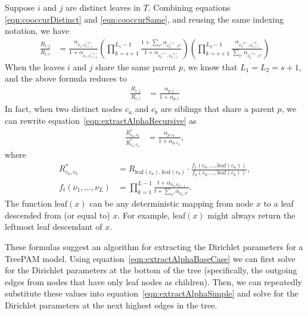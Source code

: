 \documentclass{article}
\theoremstyle{definition}
\newcommand{\leaf}{\text{leaf}}
\begin{document}
Suppose $i$ and $j$ are distinct leaves in $T$.
Combining equations \eqref{eqn:cooccurDistinct} and \eqref{eqn:cooccurSame}, and reusing the same indexing notation, we have
\begin{align}
\frac{R_{i,j}}{R_{i,i}}
&=
\frac
  { \alpha_{ \nu_s, \nu_{s+1}^{(2)} } }
  { 1 + \alpha_{ \nu_s, \nu_{s+1}^{(1)} } }
\left(
  \prod_{k=s+1}^{L_1-1}
    \frac
      { 1 + \sum_{\nu'} \alpha_{ \nu_k^{(1)}, \nu' } }
      { 1 + \alpha_{ \nu_k^{(1)}, \nu_{k+1}^{(1)} } }
\right)
\left(
  \prod_{k=s+1}^{L_2-1}
    \frac
      { \alpha_{ \nu_k^{(2)}, \nu_{k+1}^{(2)} } }
      { \sum_{\nu'} \alpha_{ \nu_k^{(2)}, \nu' } }
\right)
\label{eqn:extractAlphaRecursive}
\end{align}
When the leaves $i$ and $j$ share the same parent $p$, we know that $L_1 = L_2 = s+1$, and the above formula reduces to
\begin{align}
\frac{R_{i,j}}{R_{i,i}}
&=
\frac
  { \alpha_{ p, j } }
  { 1 + \alpha_{ p, i } }
\label{eqn:extractAlphaBaseCase}
\end{align}
In fact, when two distinct nodes $c_a$ and $c_b$ are siblings that share a parent $p$, we can rewrite equation~\eqref{eqn:extractAlphaRecursive} as
\begin{align}
\frac{R^*_{c_a,c_b}}{R^*_{c_a,c_a}}
&=
\frac
  { \alpha_{ p, c_b } }
  { 1 + \alpha_{ p, c_a } },
\label{eqn:extractAlphaSimple}
\end{align}
where
\begin{align*}
R^*_{c_a,c_b}
&= R_{\leaf(c_a),\leaf(c_b)} \cdot \frac{ f_1(c_a, \ldots, \leaf(c_a)) }{ f_0(c_b, \ldots, \leaf(c_b)) },
\\
f_t(\nu_{1}, \ldots, \nu_L)
&=
  \prod_{k=1}^{L-1}
    \frac
      { t + \alpha_{ \nu_k, \nu_{k+1} } }
      { t + \sum_{\nu'} \alpha_{ \nu_k, \nu' } }.
\end{align*}
The function $\leaf(x)$ can be any deterministic mapping from node $x$ to a leaf descended from (or equal to) $x$.
For example, $\leaf(x)$ might always return the leftmost leaf descendant of $x$.

These formulas suggest an algorithm for extracting the Dirichlet parameters for a TreePAM model.
Using equation~\eqref{eqn:extractAlphaBaseCase} we can first solve for the Dirichlet parameters at the bottom of the tree (specifically, the outgoing edges from nodes that have only leaf nodes as children).
Then, we can repeatedly substitute these values into equation~\eqref{eqn:extractAlphaSimple} and solve for the Dirichlet parameters at the next highest edges in the tree.
\end{document}
